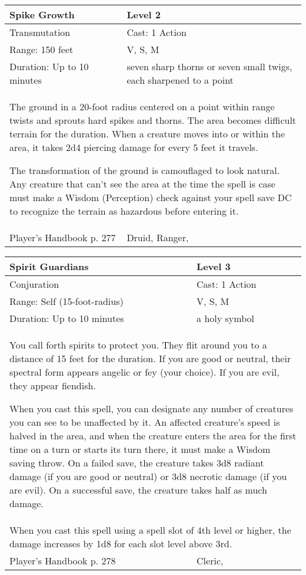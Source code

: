 \documentclass[11pt]{report}
\begin{document}
\begin{table}[H]
	\begin{tabular}{||p{6cm}|p{6cm}||}
		\hline\hline
		\bf{Spike Growth} & Level 2\\ \hline
		Transmutation & Cast: 1 Action\\ \hline
		Range: 150 feet & V, S, M\\ \hline
		Duration: Up to 10 minutes & seven sharp thorns or seven small twigs, each sharpened to a point\\ \hline
		\multicolumn{2}{||p{12cm}||}{The ground in a 20-foot radius centered on a point within range twists and sprouts hard spikes and thorns. The area becomes difficult terrain for the duration. When a creature moves into or within the area, it takes 2d4 piercing damage for every 5 feet it travels.

The transformation of the ground is camouflaged to look natural. Any creature that can’t see the area at the time the spell is case must make a Wisdom (Perception) check against your spell save DC to recognize the terrain as hazardous before entering it.}\\ \hline
Player's Handbook p. 277 & Druid, Ranger, \\ \hline\hline
	\end{tabular}
\end{table}

\begin{table}[H]
	\begin{tabular}{||p{6cm}|p{6cm}||}
		\hline\hline
		\bf{Spirit Guardians} & Level 3\\ \hline
		Conjuration & Cast: 1 Action\\ \hline
		Range: Self (15-foot-radius) & V, S, M\\ \hline
		Duration: Up to 10 minutes & a holy symbol\\ \hline
		\multicolumn{2}{||p{12cm}||}{You call forth spirits to protect you.
They flit around you to a distance of 15 feet for the duration. If you are good or neutral, their spectral form appears angelic or fey (your choice). If you are evil, they appear fiendish.

When you cast this spell, you can designate any number of creatures you can see to be unaffected by it. An affected creature’s speed is halved in the area, and when the creature enters the area for the first time on a turn or starts its turn there, it must make a Wisdom saving throw. On a failed save, the creature takes 3d8 radiant damage (if you are good or neutral) or 3d8 necrotic damage (if you are evil). On a successful save, the creature takes half as much damage.}\\ \hline
		\multicolumn{2}{||p{12cm}||}{When you cast this spell using a spell slot of 4th level or higher, the damage increases by 1d8 for each slot level above 3rd.}\\ \hline
Player's Handbook p. 278 & Cleric, \\ \hline\hline
	\end{tabular}
\end{table}
\end{document}
